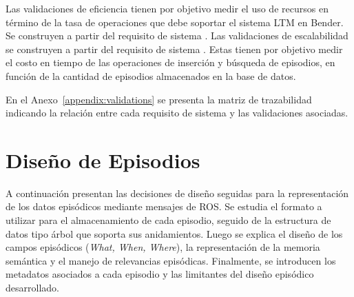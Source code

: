Las validaciones  de eficiencia tienen por objetivo medir el uso de recursos en término de la tasa de operaciones que debe soportar el sistema LTM en Bender. Se construyen a partir del requisito de sistema . Las validaciones de escalabilidad se construyen a partir del requisito de sistema . Estas tienen por objetivo medir el costo en tiempo de las operaciones de inserción y búsqueda de episodios, en función de la cantidad de episodios almacenados en la base de datos.

En el Anexo~\ref{appendix:validations} se presenta la matriz de trazabilidad indicando la relación entre cada requisito de sistema y las validaciones asociadas.





\section{Diseño de Episodios}\label{sec:ep_design}

A continuación presentan las decisiones de diseño seguidas para la representación de los datos episódicos mediante mensajes de ROS. Se estudia el formato a utilizar para el almacenamiento de cada episodio, seguido de la estructura de datos tipo árbol que soporta sus anidamientos. Luego se explica el diseño de los campos episódicos (\textit{What, When, Where}), la representación de la memoria semántica y el manejo de relevancias episódicas. Finalmente, se introducen los metadatos asociados a cada episodio y las limitantes del diseño episódico desarrollado.


